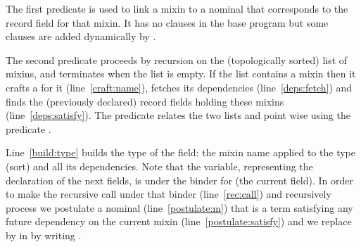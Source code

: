 \documentclass[a4paper,UKenglish,cleveref, autoref]{lipics-v2019}
\newcommand{\mixin}{mixin}
\newcommand{\mixins}{mixins}
\theoremstyle{implem}
\theoremstyle{implem}
\theoremstyle{command}
\begin{document}
{{The first predicate  is used
to link a \mixin{} to a nominal that corresponds to the record field
for that mixin. It has no clauses in the base program but some clauses
are added dynamically by .

The second predicate proceeds by recursion on the (topologically sorted) list of \mixins{},
and terminates when the list is empty. If the list contains a \mixin{} 
then it crafts a  for it (line~\ref{craft:name}),
fetches its dependencies (line~\ref{deps:fetch}) and
finds the (previously declared) record fields holding these \mixins{}
(line~\ref{deps:satisfy}).
The  predicate relates the two lists  and
 point wise using the predicate .

Line~\ref{build:type} builds the type of the field: the \mixin{} name applied
to the type (sort) and all its dependencies.
Note that the  variable, representing the declaration of the
next fields, is under the binder for  (the current field).
In order to make the recursive call under that binder (line~\ref{rec:call})
and recursively process  we postulate a nominal
 (line~\ref{postulate:m}) that is a term satisfying any
future dependency on the current \mixin{} (line~\ref{postulate:satisfy})
and we replace  by  in  by writing
.


}}
\end{document}
